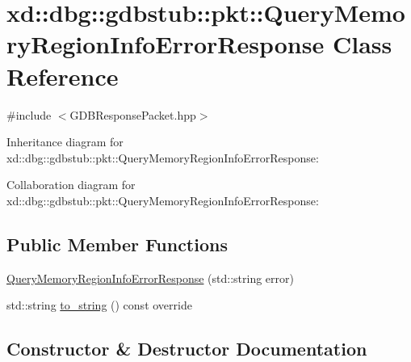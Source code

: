 \hypertarget{classxd_1_1dbg_1_1gdbstub_1_1pkt_1_1_query_memory_region_info_error_response}{}\section{xd\+:\+:dbg\+:\+:gdbstub\+:\+:pkt\+:\+:Query\+Memory\+Region\+Info\+Error\+Response Class Reference}
\label{classxd_1_1dbg_1_1gdbstub_1_1pkt_1_1_query_memory_region_info_error_response}


{\ttfamily \#include $<$G\+D\+B\+Response\+Packet.\+hpp$>$}



Inheritance diagram for xd\+:\+:dbg\+:\+:gdbstub\+:\+:pkt\+:\+:Query\+Memory\+Region\+Info\+Error\+Response\+:


Collaboration diagram for xd\+:\+:dbg\+:\+:gdbstub\+:\+:pkt\+:\+:Query\+Memory\+Region\+Info\+Error\+Response\+:
\subsection*{Public Member Functions}
\begin{DoxyCompactItemize}
\item 
\mbox{\hyperlink{classxd_1_1dbg_1_1gdbstub_1_1pkt_1_1_query_memory_region_info_error_response_aac17ccb824b38549f62bf8d99a3800e2}{Query\+Memory\+Region\+Info\+Error\+Response}} (std\+::string error)
\item 
std\+::string \mbox{\hyperlink{classxd_1_1dbg_1_1gdbstub_1_1pkt_1_1_query_memory_region_info_error_response_af7a4e7c1a1c3a5dd8a1b6e6702101160}{to\+\_\+string}} () const override
\end{DoxyCompactItemize}


\subsection{Constructor \& Destructor Documentation}
\mbox{\label{classxd_1_1dbg_1_1gdbstub_1_1pkt_1_1_query_memory_region_info_error_response_aac17ccb824b38549f62bf8d99a3800e2}} 
